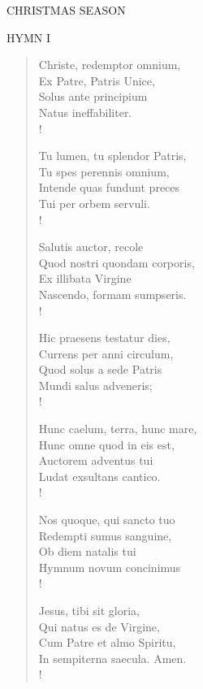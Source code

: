 \begin{center}\normalsize CHRISTMAS SEASON\\
\end{center}

\noindent\small{\uppercase{Hymn I }}\normalsize\label{christmas:firstHymn}
\begin{verse}
Christe, redemptor omnium,\\
Ex Patre, Patris Unice,\\
Solus ante principium\\
Natus ineffabiliter.\\!

Tu lumen, tu splendor Patris,\\
Tu spes perennis omnium,\\
Intende quas fundunt preces\\
Tui per orbem servuli.\\!

Salutis auctor, recole\\
Quod nostri quondam corporis,\\
Ex illibata Virgine\\
Nascendo, formam sumpseris.\\!

Hic praesens testatur dies,\\
Currens per anni circulum,\\
Quod solus a sede Patris\\
Mundi salus adveneris;\\!

Hunc caelum, terra, hunc mare,\\
Hunc omne quod in eis est,\\
Auctorem adventus tui\\
Ludat exsultans cantico.\\!

Nos quoque, qui sancto tuo\\
Redempti sumus sanguine,\\
Ob diem natalis tui\\
Hymnum novum concinimus\\!

Jesus, tibi sit gloria,\\
Qui natus es de Virgine,\\
Cum Patre et almo Spiritu,\\
In sempiterna saecula. Amen.\\!
\end{verse}

